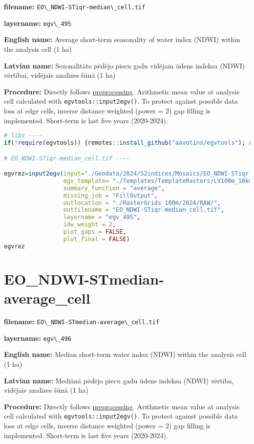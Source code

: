 \documentclass[
]{book}
\newcommand{\passthrough}[1]{#1}
\begin{document}
\textbf{filename:} \passthrough{\lstinline!EO\_NDWI-STiqr-median\_cell.tif!}

\textbf{layername:} \passthrough{\lstinline!egv\_495!}

\textbf{English name:} Average short-term seasonality of water index (NDWI) within the analysis cell (1 ha)

\textbf{Latvian name:} Sezonalitāte pēdējo piecu gadu vidējam ūdens indeksa (NDWI) vērtībai, vidējais analīzes šūnā (1 ha)

\textbf{Procedure:} Directly follows \hyperref[Ch04.13]{preprocessing}. Arithmetic mean value at analysis cell
calculated with \passthrough{\lstinline!egvtools::input2egv()!}. To protect against possible data loss at edge cells,
inverse distance weighted (power = 2) gap filling is implemented. Short-term is last five years (2020-2024).

\begin{lstlisting}[language=R]
# libs ----
if(!require(egvtools)) {remotes::install_github("aavotins/egvtools"); require(egvtools)}

# EO_NDWI-STiqr-median_cell.tif ----

egvrez=input2egv(input="./Geodata/2024/S2indices/Mosaics/EO_NDWI-STiqr.tif",
                 egv_template= "./Templates/TemplateRasters/LV100m_10km.tif",
                 summary_function = "average",
                 missing_job = "FillOutput",
                 outlocation = "./RasterGrids_100m/2024/RAW/",
                 outfilename = "EO_NDWI-STiqr-median_cell.tif",
                 layername = "egv_495",
                 idw_weight = 2,
                 plot_gaps = FALSE,
                 plot_final = FALSE)
egvrez
\end{lstlisting}

\section{EO\_NDWI-STmedian-average\_cell}\label{ch06.496}

\textbf{filename:} \passthrough{\lstinline!EO\_NDWI-STmedian-average\_cell.tif!}

\textbf{layername:} \passthrough{\lstinline!egv\_496!}

\textbf{English name:} Median short-term water index (NDWI) within the analysis cell (1 ha)

\textbf{Latvian name:} Mediānā pēdējo piecu gadu ūdens indeksa (NDWI) vērtība, vidējais analīzes šūnā (1 ha)

\textbf{Procedure:} Directly follows \hyperref[Ch04.13]{preprocessing}. Arithmetic mean value at analysis cell
calculated with \passthrough{\lstinline!egvtools::input2egv()!}. To protect against possible data loss at edge cells,
inverse distance weighted (power = 2) gap filling is implemented. Short-term is last five years (2020-2024).
\end{document}
